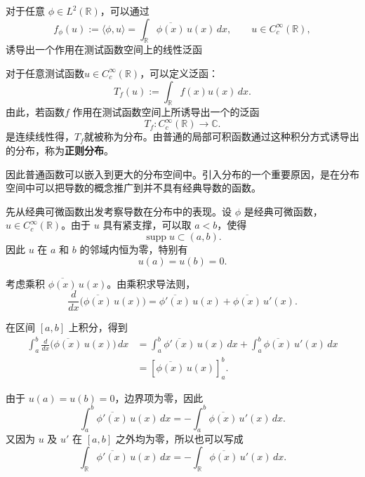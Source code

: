 \documentclass[UTF8,a4paper,11pt,openany]{ctexbook}
\begin{document}
对于任意 $\phi\in L^2(\mathbb R)$，可以通过
\begin{equation}
    f_\phi(u)
    :=
    \langle \phi,u\rangle
    =
    \int_{\mathbb R}
    \overline{\phi(x)}\,u(x)\,dx,
    \qquad
    u\in C_c^\infty(\mathbb R),
\end{equation}
诱导出一个作用在测试函数空间上的线性泛函

\begin{definition}[分布]
对于任意测试函数$u\in C_c^\infty(\mathbb R)$，可以定义泛函：
\begin{equation}
    T_f(u)
    :=
    \int_{\mathbb R} f(x)u(x)\,dx.
\end{equation}
由此，若函数$f$ 作用在测试函数空间上所诱导出一个的泛函
\[
T_f:C_c^\infty(\mathbb R)\to\mathbb C.
\]
是连续线性得，$T_f$就被称为分布。由普通的局部可积函数通过这种积分方式诱导出的分布，称为\textbf{正则分布}。
\end{definition}

因此普通函数可以嵌入到更大的分布空间中。引入分布的一个重要原因，是在分布空间中可以把导数的概念推广到并不具有经典导数的函数。

先从经典可微函数出发考察导数在分布中的表现。设 $\phi$ 是经典可微函数，$u\in C_c^\infty(\mathbb R)$。由于 $u$ 具有紧支撑，可以取 $a<b$，使得
\[
\operatorname{supp}u\subset(a,b).
\]
因此 $u$ 在 $a$ 和 $b$ 的邻域内恒为零，特别有
\[
u(a)=u(b)=0.
\]

考虑乘积 $\overline{\phi(x)}\,u(x)$。由乘积求导法则，
\begin{equation}
    \frac{d}{dx}
    \bigl(
        \overline{\phi(x)}\,u(x)
    \bigr)
    =
    \overline{\phi'(x)}\,u(x)
    +
    \overline{\phi(x)}\,u'(x).
\end{equation}

在区间 $[a,b]$ 上积分，得到
\begin{align}
    \int_a^b
    \frac{d}{dx}
    \bigl(
        \overline{\phi(x)}\,u(x)
    \bigr)\,dx
    &=
    \int_a^b
    \overline{\phi'(x)}\,u(x)\,dx
    +
    \int_a^b
    \overline{\phi(x)}\,u'(x)\,dx
    \nonumber\\
    &=
    \left[
        \overline{\phi(x)}\,u(x)
    \right]_a^b.
\end{align}

由于 $u(a)=u(b)=0$，边界项为零，因此
\[
\int_a^b
\overline{\phi'(x)}\,u(x)\,dx
=
-
\int_a^b
\overline{\phi(x)}\,u'(x)\,dx.
\]
又因为 $u$ 及 $u'$ 在 $[a,b]$ 之外均为零，所以也可以写成
\begin{equation}
    \int_{\mathbb R}
    \overline{\phi'(x)}\,u(x)\,dx
    =
    -
    \int_{\mathbb R}
    \overline{\phi(x)}\,u'(x)\,dx.
\end{equation}
\end{document}
